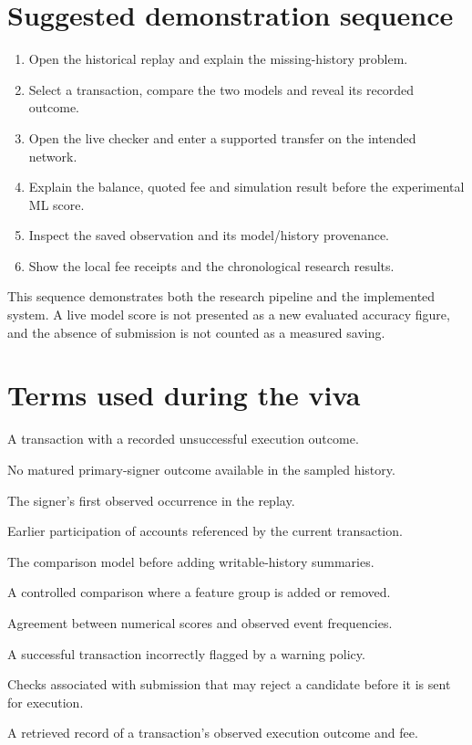 \documentclass[12pt,a4paper,oneside]{report}
\begin{document}
\section{Suggested demonstration sequence}
\begin{enumerate}
\item Open the historical replay and explain the missing-history problem.
\item Select a transaction, compare the two models and reveal its recorded outcome.
\item Open the live checker and enter a supported transfer on the intended network.
\item Explain the balance, quoted fee and simulation result before the experimental ML score.
\item Inspect the saved observation and its model/history provenance.
\item Show the local fee receipts and the chronological research results.
\end{enumerate}
This sequence demonstrates both the research pipeline and the implemented system. A live model score is not presented as a new evaluated accuracy figure, and the absence of submission is not counted as a measured saving.
\section{Terms used during the viva}
\begin{description}[style=nextline]
\item[Execution failure] A transaction with a recorded unsuccessful execution outcome.
\item[Cold history] No matured primary-signer outcome available in the sampled history.
\item[First appearance] The signer's first observed occurrence in the replay.
\item[Shared-account context] Earlier participation of accounts referenced by the current transaction.
\item[Baseline] The comparison model before adding writable-history summaries.
\item[Ablation] A controlled comparison where a feature group is added or removed.
\item[Calibration] Agreement between numerical scores and observed event frequencies.
\item[False positive] A successful transaction incorrectly flagged by a warning policy.
\item[Preflight] Checks associated with submission that may reject a candidate before it is sent for execution.
\item[Receipt] A retrieved record of a transaction's observed execution outcome and fee.
\end{description}
\end{document}
